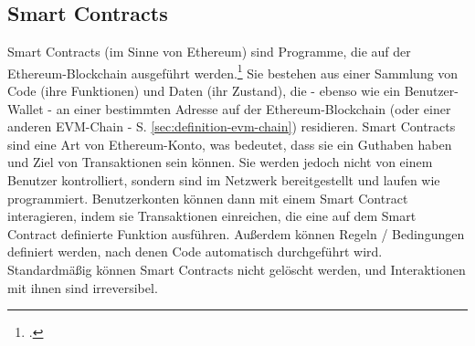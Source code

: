 \subsection{Smart Contracts}
\label{sec:definition-smart-contracts}
Smart Contracts (im Sinne von Ethereum) sind Programme, die auf der Ethereum-Blockchain ausgeführt werden.\footcite[Vgl. hierzu und zum Folgenden][]{w4} 
Sie bestehen aus einer Sammlung von Code (ihre Funktionen) und Daten (ihr Zustand), die - ebenso wie ein Benutzer-Wallet - an einer bestimmten Adresse auf der Ethereum-Blockchain (oder einer anderen EVM-Chain - S. \ref{sec:definition-evm-chain}) residieren.
Smart Contracts sind eine Art von Ethereum-Konto, was bedeutet, dass sie ein Guthaben haben und Ziel von Transaktionen sein können. 
Sie werden jedoch nicht von einem Benutzer kontrolliert, sondern sind im Netzwerk bereitgestellt und laufen wie programmiert. 
Benutzerkonten können dann mit einem Smart Contract interagieren, indem sie Transaktionen einreichen, die eine auf dem Smart Contract definierte Funktion ausführen. 
Außerdem können Regeln / Bedingungen definiert werden, nach denen Code automatisch durchgeführt wird.
Standardmäßig können Smart Contracts nicht gelöscht werden, und Interaktionen mit ihnen sind irreversibel.